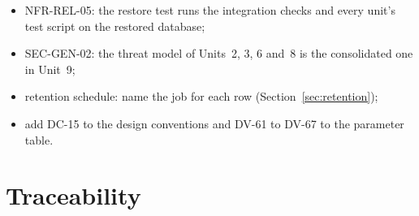 \documentclass[11pt,a4paper]{article}
\begin{document}
\begin{enumerate}[label=\textbf{I-\arabic*}, leftmargin=*, nosep]
\begin{itemize}[nosep]
    \item NFR-REL-05: the restore test runs the integration checks and every unit's test script on the restored database;
    \item SEC-GEN-02: the threat model of Units~2, 3, 6 and~8 is the consolidated one in Unit~9;
    \item retention schedule: name the job for each row (Section~\ref{sec:retention});
    \item add DC-15 to the design conventions and DV-61 to DV-67 to the parameter table.
  \end{itemize}
\end{enumerate}

\appendix
\section{Traceability}
\label{app:trace}
\end{document}
